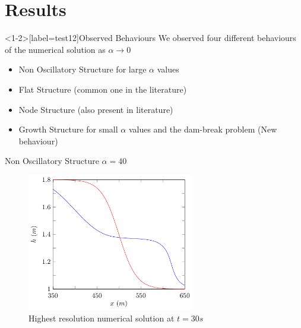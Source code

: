 \documentclass[pdf]{beamer}
\begin{document}
\section{Results}
\begin{frame}<1-2>[label=test12]{Observed Behaviours}
	We observed four different behaviours of the numerical solution as $\alpha \rightarrow 0 $
	\pause
	\begin{itemize}
		\item Non Oscillatory Structure for large $\alpha$ values
		\pause 
		\item Flat Structure (common one in the literature)
		\pause
		\item Node Structure (also present in literature)	
		\pause	
		\item Growth Structure for small $\alpha$ values and the dam-break problem (New behaviour)
	\end{itemize}
\end{frame}

\begin{frame}{Non Oscillatory Structure $\alpha = 40$}
		\begin{figure}
			\includegraphics[width=0.65\textwidth]{./Pictures/Results/Example/non.pdf}
			\caption{Highest resolution numerical solution at $t=30s$}
		\end{figure}
\end{frame}

\end{document}
